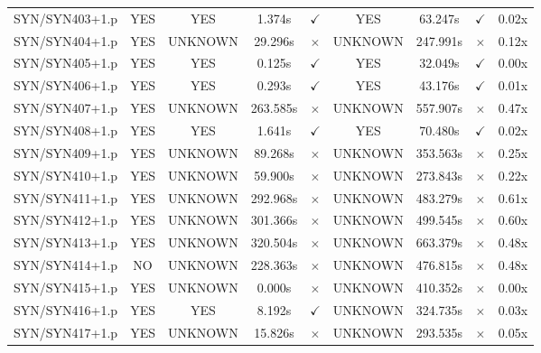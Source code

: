 \documentclass[a4paper,10pt]{article}
\begin{document}
\begin{longtable}{lcccccccc}
SYN/SYN403+1.p & YES & YES & 1.374s & \cellcolor{matchcolor}$\checkmark$ & YES & 63.247s & \cellcolor{matchcolor}$\checkmark$ & 0.02x \\
SYN/SYN404+1.p & YES & UNKNOWN & 29.296s & \cellcolor{mismatchcolor}$\times$ & UNKNOWN & 247.991s & \cellcolor{mismatchcolor}$\times$ & 0.12x \\
SYN/SYN405+1.p & YES & YES & 0.125s & \cellcolor{matchcolor}$\checkmark$ & YES & 32.049s & \cellcolor{matchcolor}$\checkmark$ & 0.00x \\
SYN/SYN406+1.p & YES & YES & 0.293s & \cellcolor{matchcolor}$\checkmark$ & YES & 43.176s & \cellcolor{matchcolor}$\checkmark$ & 0.01x \\
SYN/SYN407+1.p & YES & UNKNOWN & 263.585s & \cellcolor{mismatchcolor}$\times$ & UNKNOWN & 557.907s & \cellcolor{mismatchcolor}$\times$ & 0.47x \\
SYN/SYN408+1.p & YES & YES & 1.641s & \cellcolor{matchcolor}$\checkmark$ & YES & 70.480s & \cellcolor{matchcolor}$\checkmark$ & 0.02x \\
SYN/SYN409+1.p & YES & UNKNOWN & 89.268s & \cellcolor{mismatchcolor}$\times$ & UNKNOWN & 353.563s & \cellcolor{mismatchcolor}$\times$ & 0.25x \\
SYN/SYN410+1.p & YES & UNKNOWN & 59.900s & \cellcolor{mismatchcolor}$\times$ & UNKNOWN & 273.843s & \cellcolor{mismatchcolor}$\times$ & 0.22x \\
SYN/SYN411+1.p & YES & UNKNOWN & 292.968s & \cellcolor{mismatchcolor}$\times$ & UNKNOWN & 483.279s & \cellcolor{mismatchcolor}$\times$ & 0.61x \\
SYN/SYN412+1.p & YES & UNKNOWN & 301.366s & \cellcolor{mismatchcolor}$\times$ & UNKNOWN & 499.545s & \cellcolor{mismatchcolor}$\times$ & 0.60x \\
SYN/SYN413+1.p & YES & UNKNOWN & 320.504s & \cellcolor{mismatchcolor}$\times$ & UNKNOWN & 663.379s & \cellcolor{mismatchcolor}$\times$ & 0.48x \\
SYN/SYN414+1.p & NO & UNKNOWN & 228.363s & \cellcolor{mismatchcolor}$\times$ & UNKNOWN & 476.815s & \cellcolor{mismatchcolor}$\times$ & 0.48x \\
SYN/SYN415+1.p & YES & UNKNOWN & 0.000s & \cellcolor{mismatchcolor}$\times$ & UNKNOWN & 410.352s & \cellcolor{mismatchcolor}$\times$ & 0.00x \\
SYN/SYN416+1.p & YES & YES & 8.192s & \cellcolor{matchcolor}$\checkmark$ & UNKNOWN & 324.735s & \cellcolor{mismatchcolor}$\times$ & 0.03x \\
SYN/SYN417+1.p & YES & UNKNOWN & 15.826s & \cellcolor{mismatchcolor}$\times$ & UNKNOWN & 293.535s & \cellcolor{mismatchcolor}$\times$ & 0.05x \\

\end{longtable}
\end{document}
